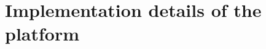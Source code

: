 \setlength{\parindent}{0pt}
\setlength{\parskip}{0.6em}

\chapter[Platform Implementation]{Implementation details of the platform}
\label{chap:implementation}









